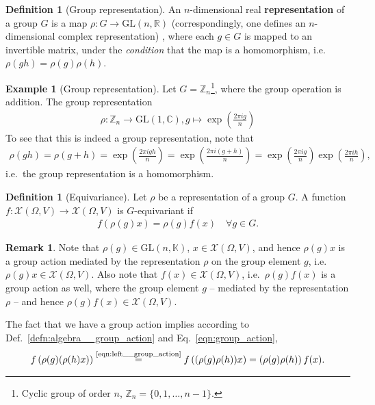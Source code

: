 \documentclass[12pt, a4paper]{article}
\numberwithin{equation}{section}
\theoremstyle{definition}
\theoremstyle{definition}
\newtheorem{defn}[thm]{Definition} %
\newtheorem{exmp}[thm]{Example} %
\newtheorem{remark}[thm]{Remark} %
\begin{document}
	\begin{defn}[Group representation]
		An $n$-dimensional real \textbf{representation} of a group $G$ is a map $\rho:G\rightarrow \text{GL}(n, \mathbb R)$ (correspondingly, one defines an $n$-dimensional complex representation) \cite[p.~15]{bronstein2021geometric}, where each $g\in G$ is mapped to an invertible matrix, under the \textit{condition} that the map is a homomorphism, i.e.~$\rho(gh) = \rho(g)\rho(h)$.
	\end{defn}

	\begin{exmp}[Group representation]
		Let $G = \mathbb Z_{n}$\footnote{Cyclic group of order $n$, $\mathbb Z_n = \{ 0, 1, \dots, n - 1 \}$.}, where the group operation is addition. The group representation 
		\begin{align}
			\rho: \mathbb Z_{n} \rightarrow \text{GL}(1, \mathbb C), g\mapsto \exp\left(\frac{2\pi ig}{n}\right)
		\end{align}
		To see that this is indeed a group representation, note that
		\begin{align}
			\rho(gh) = \rho(g + h) = \exp\left( \frac{2\pi igh}{n} \right) = \exp\left( \frac{2\pi i\left(g + h\right)}{n} \right) = \exp\left( \frac{2\pi ig}{n} \right)\exp\left( \frac{2\pi ih}{n} \right),
		\end{align}
		i.e.~the group representation is a homomorphism.
	\end{exmp}
	
	\begin{defn}[Equivariance]
		Let $\rho$ be a representation of a group $G$. A function $f:\mathcal X(\Omega, V) \rightarrow \mathcal X(\Omega, V)$ is $G$-equivariant if 
		\begin{align}\label{eqn:group_action}
			f(\rho(g)x) = \rho(g)f(x) \quad \forall g\in G.
		\end{align}
	\end{defn}
	
	\begin{remark}
		Note that $\rho(g)\in \text{GL}(n, \mathbb K)$, $x\in \mathcal X(\Omega, V)$, and hence $\rho(g)x$ is a group action mediated by the representation $\rho$ on the group element $g$, i.e.~$\rho(g)x\in \mathcal X(\Omega, V)$. Also note that $f(x)\in \mathcal X(\Omega, V)$, i.e.~$\rho(g)f(x)$ is a group action as well, where the group element $g$ -- mediated by the representation $\rho$ -- and hence $\rho(g)f(x) \in \mathcal X(\Omega, V)$.
		
		The fact that we have a group action implies according to Def.~\ref{defn:algebra__group_action} and Eq.~\eqref{eqn:group_action},
		\begin{align}
			f\left(\rho(g)(\rho(h)x)\right) \overset{\scriptsize \eqref{eqn:left__group_action}}{=} f\left( (\rho(g)\rho(h))x \right) = \left(\rho(g)\rho(h)\right)f(x).
		\end{align}
	\end{remark}
	
\end{document}
